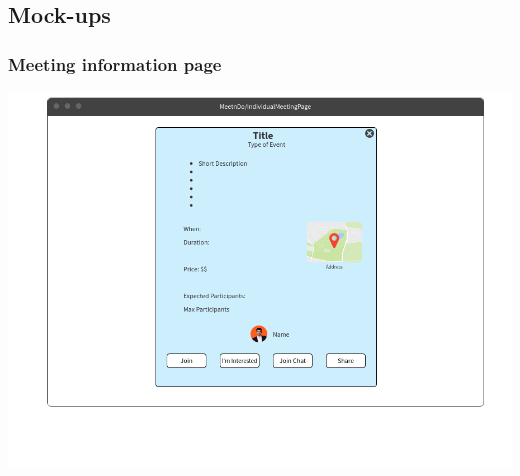 \documentclass[conference]{IEEEtran}
\begin{document}
\subsection{Mock-ups}

\subsubsection{Meeting information page}

\includegraphics[scale=0.3]{mockups/meeting}
\end{document}
